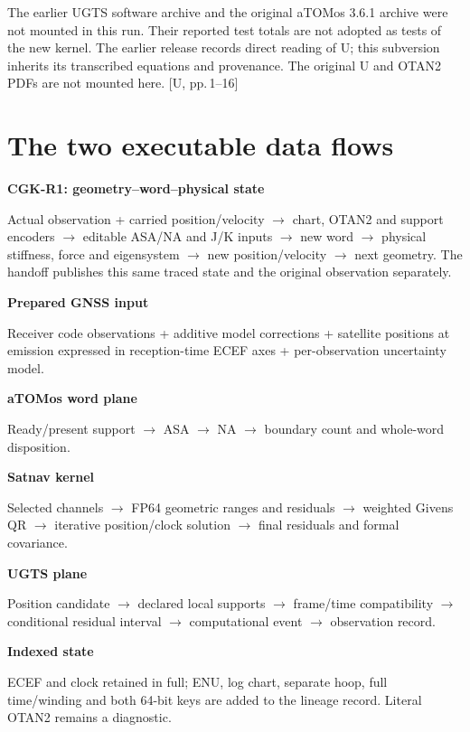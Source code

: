 \documentclass[11pt,a4paper]{article}
\newcommand{\src}[1]{\textcolor{muted}{[U, #1]}}
\begin{document}
The earlier UGTS software archive and the original aTOMos 3.6.1 archive were not mounted
in this run. Their reported test totals are not adopted as tests of the new kernel.
The earlier release records direct reading of U; this subversion inherits its
transcribed equations and provenance. The original U and OTAN2 PDFs are not mounted
here. \src{pp.\,1--16}
\clearpage

\section*{The two executable data flows}
\begin{panel}
\textbf{CGK-R1: geometry--word--physical state}\par
Actual observation + carried position/velocity $\to$ chart, OTAN2 and support
encoders $\to$ editable ASA/NA and J/K inputs $\to$ new word $\to$ physical
stiffness, force and eigensystem $\to$ new position/velocity $\to$ next geometry.
The handoff publishes this same traced state and the original observation separately.
\end{panel}
\begin{panel}
\textbf{Prepared GNSS input}\par
Receiver code observations + additive model corrections + satellite positions at
emission expressed in reception-time ECEF axes + per-observation uncertainty model.\par
\textbf{aTOMos word plane}\par
Ready/present support $\to$ ASA $\to$ NA $\to$ boundary count and whole-word disposition.\par
\textbf{Satnav kernel}\par
Selected channels $\to$ FP64 geometric ranges and residuals $\to$ weighted Givens QR
$\to$ iterative position/clock solution $\to$ final residuals and formal covariance.\par
\textbf{UGTS plane}\par
Position candidate $\to$ declared local supports $\to$ frame/time compatibility
$\to$ conditional residual interval $\to$ computational event $\to$ observation record.\par
\textbf{Indexed state}\par
ECEF and clock retained in full; ENU, log chart, separate hoop, full time/winding and
both 64-bit keys are added to the lineage record. Literal OTAN2 remains a diagnostic.
\end{panel}
\end{document}
